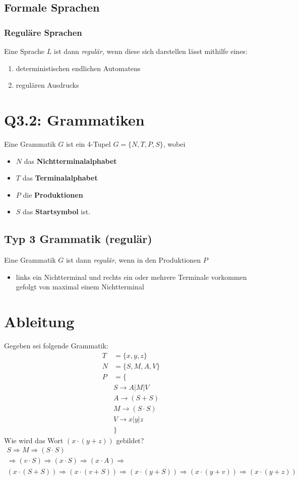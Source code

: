 \documentclass{article}
\begin{document}
\subsection{Formale Sprachen}
\subsubsection{Reguläre Sprachen}
Eine Sprache $L$ ist dann \textit{regulär}, wenn diese sich darstellen lässt mithilfe eines:
\begin{enumerate}
    \item deterministischen endlichen Automatens
    \item regulären Ausdrucks
\end{enumerate}

\section{Q3.2: Grammatiken}
Eine Grammatik $G$ ist ein 4-Tupel $G=\{N,T,P,S\}$, wobei
\begin{itemize}
    \item $N$ das \textbf{Nichtterminalalphabet}
    \item $T$ das \textbf{Terminalalphabet}
    \item $P$ die \textbf{Produktionen}
    \item $S$ das \textbf{Startsymbol} ist.
\end{itemize}
\subsection{Typ 3 Grammatik (regulär)}
Eine Grammatik $G$ ist dann \textit{regulär}, wenn in den Produktionen $P$
\begin{itemize}
    \item links ein Nichtterminal und rechts ein oder mehrere Terminale vorkommen gefolgt von maximal einem Nichtterminal
\end{itemize}
\section{Ableitung}
Gegeben sei folgende Grammatik:
\begin{align*}
    T &= \{x,y,z\}\\
    N &= \{S, M, A, V\}\\
    P &= \{\\
        &S\rightarrow A|M|V\\
        &A\rightarrow (S+S)\\
        &M\rightarrow (S\cdot S)\\
        &V\rightarrow x|y|z\\
    &\}
\end{align*}
Wie wird das Wort $(x\cdot (y+z))$ gebildet?
\begin{align*}
    S\Rightarrow M\Rightarrow (S\cdot S)\\
    \Rightarrow (v\cdot S)\Rightarrow (x\cdot S)\Rightarrow (x\cdot A)\Rightarrow\\ (x\cdot (S+S))\Rightarrow (x\cdot (v + S))\Rightarrow (x\cdot (y + S))\Rightarrow (x\cdot (y + v))\Rightarrow (x\cdot (y + z))
\end{align*}
\end{document}
